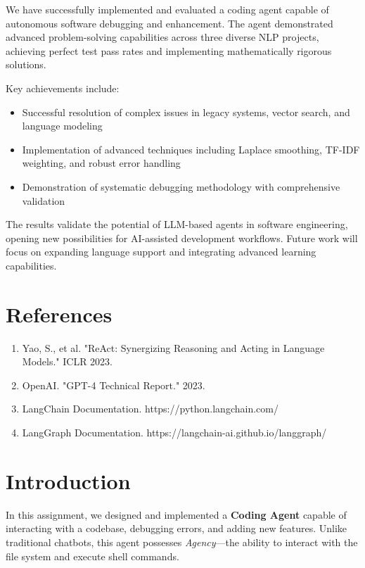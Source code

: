 \documentclass[12pt, a4paper]{article}
\begin{document}
We have successfully implemented and evaluated a coding agent capable of autonomous software debugging and enhancement. The agent demonstrated advanced problem-solving capabilities across three diverse NLP projects, achieving perfect test pass rates and implementing mathematically rigorous solutions.

Key achievements include:
\begin{itemize}
    \item Successful resolution of complex issues in legacy systems, vector search, and language modeling
    \item Implementation of advanced techniques including Laplace smoothing, TF-IDF weighting, and robust error handling
    \item Demonstration of systematic debugging methodology with comprehensive validation
\end{itemize}

The results validate the potential of LLM-based agents in software engineering, opening new possibilities for AI-assisted development workflows. Future work will focus on expanding language support and integrating advanced learning capabilities.

\section{References}

\begin{enumerate}
    \item Yao, S., et al. "ReAct: Synergizing Reasoning and Acting in Language Models." ICLR 2023.
    \item OpenAI. "GPT-4 Technical Report." 2023.
    \item LangChain Documentation. https://python.langchain.com/
    \item LangGraph Documentation. https://langchain-ai.github.io/langgraph/
\end{enumerate}


\section{Introduction}
In this assignment, we designed and implemented a \textbf{Coding Agent} capable of interacting with a codebase, debugging errors, and adding new features. Unlike traditional chatbots, this agent possesses \textit{Agency}—the ability to interact with the file system and execute shell commands. 
\end{document}
